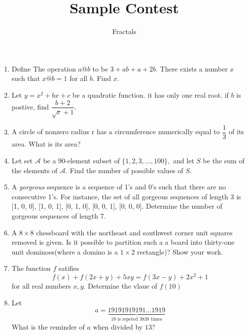 \documentclass[a4paper]{article}
\theoremstyle{definition}
\begin{document}
\author{Fractals}
\title{\textbf{Sample Contest}}
\maketitle
\noindent
\begin{enumerate}


\item Define The operation $a@b$ to be $3 + ab + a + 2b$. There exists a number
$x$ such that $x@b =1$ for all $b$. Find $x$.


\item Let $y = x^2 + bx +c$ be a quadratic function. it has only one real root. if $b$
is postive, find $\dfrac{b+2}{\sqrt{c} + 1}$.


\item A circle of nonzero radius r has a circumference numerically equal to
$\dfrac{1}{3}$ of its area. What is its area?
\item Let set $\mathcal{A}$ be a 90-element subset of $\{1,2,3,\ldots,100\},$ and let $S$ be the sum of the elements of $\mathcal{A}.$ Find the number of possible values of $S.$

    \item
 A \textit{gorgeous} sequence is a sequence of 1’s and 0’s such that there are no consecutive 1’s. For
instance, the set of all gorgeous sequences of length 3 is {[1, 0, 0], [1, 0, 1], [0, 1, 0], [0, 0, 1], [0, 0, 0]}.
Determine the number of gorgeous sequences of length 7.

 \item A \(8 \times 8\) chessboard with the northeast and southwest corner unit squares removed is given. Is it
          possible to partition such a a board into thirty-one unit dominoes(where a domino is a \(1 \times 2\) rectangle)?
          Show your work.

\item The function $f$ satifies
\[
    f(x) + f(2x+y) + 5xy = f(3x - y) + 2x^2 + 1
\]
for all real numbers $x, y$. Determine the vlaue of $f(10)$
\item Let
\[
    a = \underbrace{19191919191\dots1919}_\text{19 is repeted 3838 times}
\]
What is the reminder of $a$ when divided by $13$?
\end{enumerate}
\end{document}
